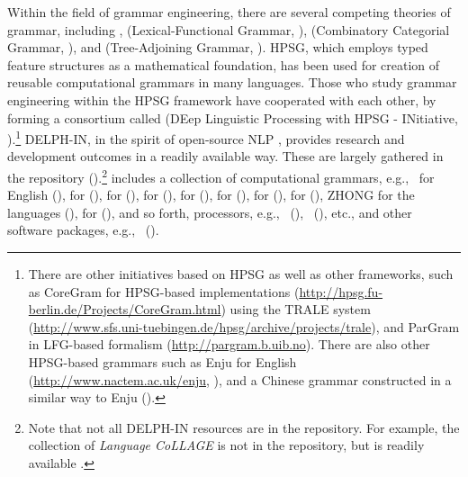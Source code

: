 Within the field of grammar engineering, there are several competing
theories of grammar, including , 
(Lexical-Functional Grammar, \citealt{bresnan:01}), 
(Combinatory Categorial Grammar, \citealt{steedman:01}), and 
(Tree-Adjoining Grammar, \citealt{joshi:schabes:97}). HPSG, which
employs typed feature structures as a mathematical foundation, has
been used for creation of reusable computational grammars in many
languages. Those who study grammar engineering within the HPSG
framework have cooperated with each other, by forming a consortium
called  (DEep Linguistic Processing with HPSG -
INitiative, ).\footnote{There are other
  initiatives based on HPSG as well as other frameworks, such as
  CoreGram for HPSG-based implementations
  (\url{http://hpsg.fu-berlin.de/Projects/CoreGram.html}) using the
  TRALE system
  (\url{http://www.sfs.uni-tuebingen.de/hpsg/archive/projects/trale}),
  and ParGram in LFG-based formalism
  (\url{http://pargram.b.uib.no}). There are also other HPSG-based
  grammars such as Enju for English
  (\url{http://www.nactem.ac.uk/enju}, \citealt{miyao:tsujii:08}), and
  a Chinese grammar constructed in a similar way to Enju
  (\citealt{yu:etal:10}).}  DELPH-IN, in the spirit of open-source NLP
\citep{pedersen:08}, provides research and development outcomes in a
readily available way. These are largely gathered in the \logon
repository ().\footnote{Note
  that not all DELPH-IN resources are in the \logon repository. For
  example, the collection of \textit{Language CoLLAGE} is not in the
  repository, but is readily available \citep{bender:14}.} \logon
includes a collection of computational grammars, e.g.,\  for
English (\citealt{flickinger:00}),  for 
(\citealt{siegel:etal:16}),  for 
(\citealt{kim:etal:11}),  for 
(\citealt{crysmann:03,crysmann:05a,crysmann:05b}),  for
 (\citealt{marimon:12}),  for
 (\citealt{branco:costa:10}),  for
 (\citealt{hellan:05}),  for
 (\citealt{osenova:11}), ZHONG for
the  languages (\citealt{fan:15a,fan:15b}),
 for  (\citealt{moeljadi:15}), and so
forth, processors, e.g., \isi{\lkb}~(\citealt{copestake:02}),
\isi{\pet}~(\citealt{callmeier:00}), etc., and other software
packages, e.g.,\ \isi{\itsdb} (\citealt{oepen:01}).





